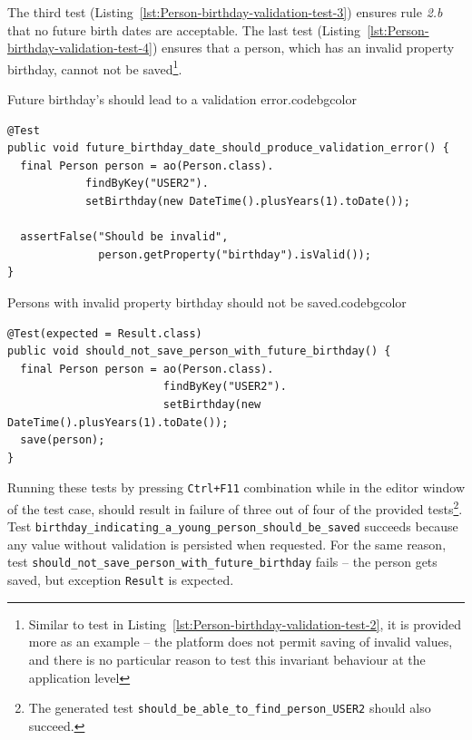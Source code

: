   The third test (Listing~\ref{lst:Person-birthday-validation-test-3}) ensures rule \emph{2.b} that no future birth dates are acceptable.
  The last test (Listing~\ref{lst:Person-birthday-validation-test-4}) ensures that a person, which has an invalid property birthday, cannot not be saved\footnote{Similar to test in Listing~\ref{lst:Person-birthday-validation-test-2}, it is provided more as an example -- the platform does not permit saving of invalid values, and there is no particular reason to test this invariant behaviour at the application level}.

\begin{code}{Future birthday's should lead to a validation error.}{\label{lst:Person-birthday-validation-test-3}}{codebgcolor}
    \begin{lstlisting}
@Test
public void future_birthday_date_should_produce_validation_error() {	
  final Person person = ao(Person.class).
			findByKey("USER2").
			setBirthday(new DateTime().plusYears(1).toDate());	

  assertFalse("Should be invalid", 
              person.getProperty("birthday").isValid());
}
    \end{lstlisting}
  \end{code}

\begin{code}{Persons with invalid property birthday should not be saved.}{\label{lst:Person-birthday-validation-test-4}}{codebgcolor}
    \begin{lstlisting}
@Test(expected = Result.class)
public void should_not_save_person_with_future_birthday() {
  final Person person = ao(Person.class).
                        findByKey("USER2").
                        setBirthday(new DateTime().plusYears(1).toDate());
  save(person);
}
    \end{lstlisting}
  \end{code}

  Running these tests by pressing \texttt{Ctrl+F11} combination while in the editor window of the test case, should result in failure of three out of four of the provided tests\footnote{The generated test \texttt{should\_be\_able\_to\_find\_person\_USER2} should also succeed.}.
  Test \texttt{birthday\_indicating\_a\_young\_person\_should\_be\_saved} succeeds because any value without validation is persisted when requested.
  For the same reason, test \texttt{should\_not\_save\_person\_with\_future\_birthday} fails -- the person gets saved, but exception \texttt{Result} is expected.

